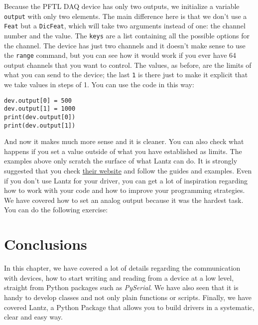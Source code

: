 Because the {PFTL} {DAQ} device has only two outputs, we initialize a
variable \texttt{output} with only two elements. The main difference
here is that we don't use a \texttt{Feat} but a \texttt{DicFeat}, which
will take two arguments instead of one: the channel number and the
value. The \texttt{keys} are a list containing all the possible options
for the channel. The device has just two channels and it doesn't make
sense to use the \texttt{range} command, but you can see how it would
work if you ever have 64 output channels that you want to control. The
values, as before, are the limits of what you can send to the device;
the last \texttt{1} is there just to make it explicit that we take
values in steps of 1. You can use the code in this way:

\begin{verbatim}
dev.output[0] = 500
dev.output[1] = 1000
print(dev.output[0])
print(dev.output[1])
\end{verbatim}

And now it makes much more sense and it is cleaner. You can also check
what happens if you set a value outside of what you have established as
limits. The examples above only scratch the surface of what Lantz can
do. It is strongly suggested that you check
\href{http://lantz.readthedocs.io}{their website} and follow the guides
and examples. Even if you don't use Lantz for your driver, you can get a
lot of inspiration regarding how to work with your code and how to
improve your programming strategies. We have covered how to set an
analog output because it was the hardest task. You can do the
following exercise:



\hypertarget{conclusions}{}
\section{Conclusions}\label{conclusions}

In this chapter, we have covered a lot of details regarding the
communication with devices, how to start writing and reading from a
device at a low level, straight from Python packages such as
\emph{PySerial}. We have also seen that it is handy to develop classes
and not only plain functions or scripts. Finally, we have covered Lantz,
a Python Package that allows you to build drivers in a systematic, clear
and easy way.

